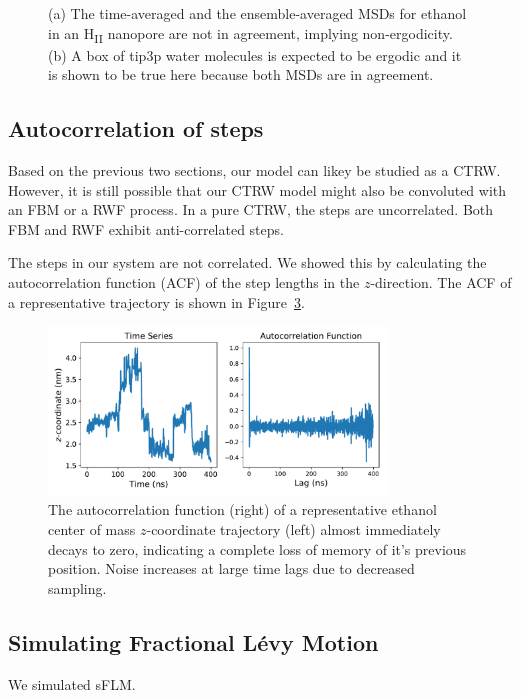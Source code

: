 \documentclass{article}
\begin{document}
\begin{figure}[!htb]
\begin{subfigure}{0.45\textwidth}
  \caption{}\label{fig:water_box_msd_comparison}
  \end{subfigure} 
  \caption{(a) The time-averaged and the ensemble-averaged MSDs for ethanol in
	  an H\textsubscript{II} nanopore are not in agreement, implying non-ergodicity.
	  (b) A box of tip3p water molecules is expected to be ergodic and it is shown to
	  be true here because both MSDs are in agreement. }\label{fig:msd_comparison}
  \end{figure}

  \subsection*{Autocorrelation of steps}



  Based on the previous two sections, our model can likey be studied as a CTRW. 
  However, it is still possible that our CTRW model might also be convoluted with
  an FBM or a RWF process. In a pure CTRW, the steps are uncorrelated. 
  Both FBM and RWF exhibit anti-correlated steps. 

  The steps in our system are not correlated. We showed this by calculating the
  autocorrelation function (ACF) of the step lengths in the $z$-direction. The
  ACF of a representative trajectory is shown in Figure~\ref{fig:eth_autocorrelation}.  
  
  \begin{figure}[!htb]
  \centering
  \includegraphics[width=0.8\textwidth]{eth_autocorrelation.pdf}
  \caption{The autocorrelation function (right) of a representative ethanol
	   center of mass $z$-coordinate trajectory (left) almost immediately decays to zero,
	   indicating a complete loss of memory of it's previous position. Noise increases
	   at large time lags due to decreased sampling.}\label{fig:eth_autocorrelation}
  \end{figure}
  
  \subsection*{Simulating Fractional L\'evy Motion}\label{section:sFLM}
  
  We simulated sFLM.

  \clearpage
  
\end{document}
